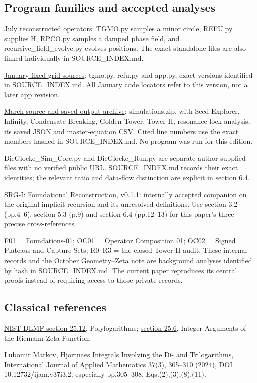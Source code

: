 \documentclass[11pt,a4paper]{article}
\begin{document}
\subsection*{Program families and accepted analyses}

\href{https://zenodo.org/records/17253999}{July reconstructed operators}: TGMO.py samples a minor circle, REFU.py supplies H, RPCO.py samples a damped phase field, and recursive\_\allowbreak{}field\_\allowbreak{}evolve.py evolves positions. The exact standalone files are also linked individually in SOURCE\_\allowbreak{}INDEX.md.


\href{https://zenodo.org/records/18285147}{January fixed-grid sources}: tgmo.py, refu.py and app.py, exact versions identified in SOURCE\_\allowbreak{}INDEX.md. All January code locators refer to this version, not a later app revision.


\href{https://zenodo.org/records/19023429}{March source and saved-output archive}: simulations.zip, with Seed Explorer, Infinity, Condensate Breaking, Golden Tower, Tower II, resonance-lock analysis, its saved JSON and master-equation CSV. Cited line numbers use the exact members hashed in SOURCE\_\allowbreak{}INDEX.md. No program was run for this edition.


DieGlocke\_\allowbreak{}Sim\_\allowbreak{}Core.py and DieGlocke\_\allowbreak{}Run.py are separate author-supplied files with no verified public URL. SOURCE\_\allowbreak{}INDEX.md records their exact identities; the relevant ratio and data-flow distinction are explicit in section 6.4.


\href{https://github.com/pzychozen/trioctagon-physics/blob/26a3f666c3082144e37fa08b752d5221053dd3bc/SRG_REDISCOVERY/PAPERS/SRG_I_FOUNDATIONAL_RECONSTRUCTION/publication/v0.1.1/README.md}{SRG-I: Foundational Reconstruction, v0.1.1}: internally accepted companion on the original implicit recursion and its unresolved definitions. Use section 3.2 (pp.4--6), section 5.3 (p.9) and section 6.4 (pp.12--13) for this paper's three precise cross-references.


F01 = Foundations-01; OC01 = Operator Composition 01; OC02 = Signed Plateaus and Capture Sets; R0--R3 = the closed Tower II audit. These internal records and the October Geometry--Zeta note are background analyses identified by hash in SOURCE\_\allowbreak{}INDEX.md. The current paper reproduces its central proofs instead of requiring access to those private records.


\subsection*{Classical references}

\href{https://dlmf.nist.gov/25.12}{NIST DLMF section 25.12}, Polylogarithms; \href{https://dlmf.nist.gov/25.6}{section 25.6}, Integer Arguments of the Riemann Zeta Function.


Lubomir Markov, \href{https://www.diogenes.bg/ijam/contents/2024-37-3/2/2.pdf}{Hjortnaes Integrals Involving the Di- and Trilogarithms}, International Journal of Applied Mathematics 37(3), 305--310 (2024), DOI 10.12732/ijam.v37i3.2; especially pp.305--308, Eqs.(2),(3),(8),(11).
\end{document}

